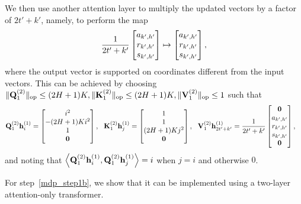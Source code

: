 We then use another  attention layer to  multiply the updated vectors by a factor of $2t'+k'$, namely, to perform the map
$$\frac{1}{2t'+k'}\begin{bmatrix}
        {a}_{k',h'} \\{r}_{k',h'}\\{s}_{k',h'}
    \end{bmatrix}\mapsto\begin{bmatrix}
        {a}_{k',h'} \\{r}_{k',h'}\\{s}_{k',h'}
    \end{bmatrix},$$ where the output vector is supported on coordinates different from the input vectors. This can be achieved by choosing $\|{{\mathbf Q}_1^{(2)}}\|_{\mathrm{op}}\leq (2{H}+1){K}, \|{{\mathbf K}_1^{(2)}}\|_{\mathrm{op}}\leq (2{H}+1){K}, \|{{\mathbf V}_1^{(2)}}\|_{\mathrm{op}}\leq1$
such that \begin{align}
    &
{\mathbf Q}^{(2)}_{1}{\mathbf h}^{(1)}_{i}=\begin{bmatrix}
         i^2\\-(2{H}+1){K} i^2\\  1\\ {\mathbf 0}
    \end{bmatrix},~~ {\mathbf K}^{(2)}_{1}{\mathbf h}^{(1)}_{j}=\begin{bmatrix}
        1\\1\\ (2{H}+1){K} j^2\\{\mathbf 0}
    \end{bmatrix},~~
{\mathbf V}^{(2)}_{1}{\mathbf h}^{(1)}_{2t'+k'}=\frac{1}{2t'+k'}\begin{bmatrix}
        {\mathbf 0}\\
        {a}_{k',h'} \\{r}_{k',h'}\\{s}_{k',h'}
    \\ {\mathbf 0}
    \end{bmatrix},\label{eq:tf_constrcut_ucbvi_multi}
\end{align}
and noting that $\left\langle{\mathbf Q}^{(2)}_1{\mathbf h}_i^{(1)},{\mathbf Q}^{(2)}_1{\mathbf h}_j^{(1)}\right\rangle=i$ when $j=i$ and otherwise $0$.

For step~\ref{mdp_step1b},  we show that it can be implemented using a two-layer attention-only transformer.

